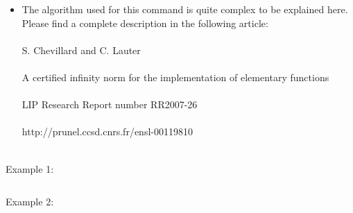 \begin{itemize}
may be defined even if the expression\n     $\\frac{g(z)}{h(z)}=\\frac{0}{0}$ does not make any sense. In this case, L'Hopital's rule\n     may be used and $\\left(\\frac{g}{h}\\right)([a,\\,b]) \\subseteq \\left(\\frac{g'}{h'}\\right)([a,\\,b])$.\n     Since the same can occur with the ratio $\\frac{g'}{h'}$, the rule is applied\n     recursively. The variable \\textbf{hopitalrecursions} controls the number of \n     recursion steps.\n   \\end{itemize}\n
\item The algorithm used for this command is quite complex to be explained here. \n   Please find a complete description in the following article:\\\\\n        S. Chevillard and C. Lauter\\\\\n        A certified infinity norm for the implementation of elementary functions\\\\\n        LIP Research Report number RR2007-26\\\\\n        http://prunel.ccsd.cnrs.fr/ensl-00119810\\\\\n\end{itemize}
\noindent Example 1: 
\begin{center}\begin{minipage}{15cm}\begin{Verbatim}[frame=single]
\end{Verbatim}
\end{minipage}\end{center}
\noindent Example 2: 
\begin{center}\begin{minipage}{15cm}\begin{Verbatim}[frame=single]
\end{Verbatim}
\end{minipage}\end{center}
